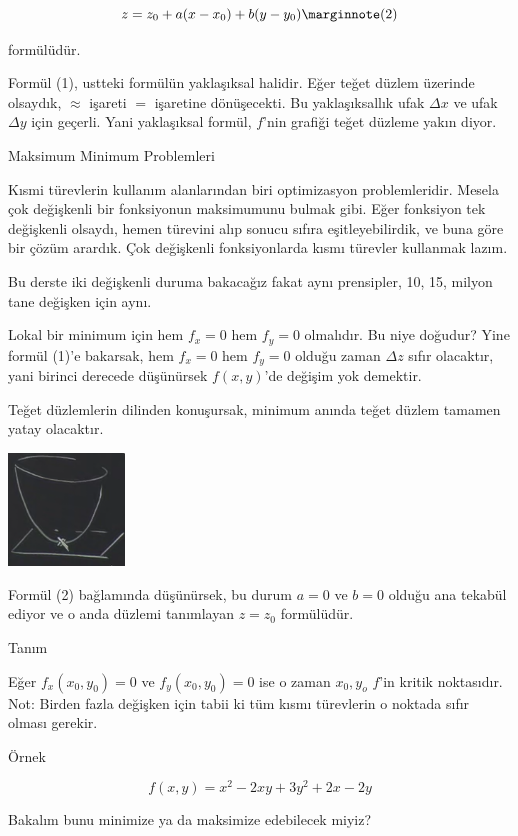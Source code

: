 \documentclass[12pt,fleqn]{article}\usepackage{../../common}
\begin{document}
$$
z = z_0 + a(x-x_0) + b(y-y_0) 
\mlabel{2}
$$

formülüdür. 

Formül (1), ustteki formülün yaklaşıksal halidir. Eğer teğet düzlem üzerinde
olsaydık, $\approx$ işareti $=$ işaretine dönüşecekti. Bu yaklaşıksallık ufak
$\Delta x$ ve ufak $\Delta y$ için geçerli. Yani yaklaşıksal formül, $f$'nin
grafiği teğet düzleme yakın diyor.

Maksimum Minimum Problemleri 

Kısmi türevlerin kullanım alanlarından biri optimizasyon problemleridir. Mesela
çok değişkenli bir fonksiyonun maksimumunu bulmak gibi. Eğer fonksiyon tek
değişkenli olsaydı, hemen türevini alıp sonucu sıfıra eşitleyebilirdik, ve buna
göre bir çözüm arardık. Çok değişkenli fonksiyonlarda kısmı türevler kullanmak
lazım.

Bu derste iki değişkenli duruma bakacağız fakat aynı prensipler, 10, 15,
milyon tane değişken için aynı. 

Lokal bir minimum için hem $f_x=0$ hem $f_y=0$ olmalıdır. Bu niye doğudur? Yine
formül (1)'e bakarsak, hem $f_x=0$ hem $f_y=0$ olduğu zaman $\Delta z$ sıfır
olacaktır, yani birinci derecede düşünürsek $f(x,y)$'de değişim yok demektir.

Teğet düzlemlerin dilinden konuşursak, minimum anında teğet düzlem tamamen
yatay olacaktır. 

\begin{center}
\includegraphics[height=3cm]{9_3.png}
\end{center}

Formül (2) bağlamında düşünürsek, bu durum $a=0$ ve $b=0$ olduğu ana tekabül
ediyor ve o anda düzlemi tanımlayan $z = z_0$ formülüdür.

Tanım

Eğer $f_x(x_0,y_0)= 0$ ve $f_y(x_0,y_0)= 0$ ise o zaman $x_0,y_o$ $f$'in kritik
noktasıdır. Not: Birden fazla değişken için tabii ki tüm kısmı türevlerin o
noktada sıfır olması gerekir.

Örnek

$$ f(x,y) = x^2 - 2xy + 3y^2 + 2x - 2y $$

Bakalım bunu minimize ya da maksimize edebilecek miyiz? 
\end{document}
